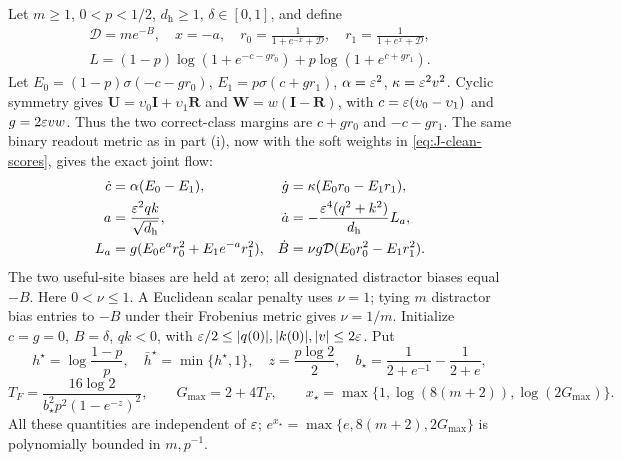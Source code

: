 Let $m\ge1$, $0<p<1/2$, $d_{\mathrm h}\ge1$, $\delta\in[0,1]$, and define
\[
 \begin{gathered}
 \mathcal D=me^{-B},\quad x=-a,\quad
 r_0=\frac1{1+e^{-x}+\mathcal D},\quad r_1=\frac1{1+e^x+\mathcal D},\\
 L=(1-p)\log(1+e^{-c-gr_0})+p\log(1+e^{c+gr_1}).
 \end{gathered}
\]
Let $E_0=(1-p)\sigma(-c-gr_0)$, $E_1=p\sigma(c+gr_1)$, $\alpha=\varepsilon^2$, $\kappa=\varepsilon^2v^2$.
Cyclic symmetry gives $\mathbf U=\upsilon_0\mathbf I+\upsilon_1\mathbf R$ and $\mathbf W=w(\mathbf I-\mathbf R)$, with
$c=\varepsilon(\upsilon_0-\upsilon_1)$ and $g=2\varepsilon vw$. Thus the two correct-class margins are $c+gr_0$ and $-c-gr_1$.
The same binary readout metric as in part (i), now with the soft weights in \cref{eq:J-clean-scores}, gives the exact joint flow:
\begin{align*}
 \dot c&=\alpha(E_0-E_1),&
 \dot g&=\kappa(E_0r_0-E_1r_1),\\
 a&=\frac{\varepsilon^2qk}{\sqrt{d_{\mathrm h}}},&
 \dot a&=-\frac{\varepsilon^4(q^2+k^2)}{d_{\mathrm h}}L_a,\\
 L_a&=g(E_0e^a r_0^2+E_1e^{-a}r_1^2),&
 \dot B&=\nu g\mathcal D(E_0r_0^2-E_1r_1^2).
\end{align*}
The two useful-site biases are held at zero; all designated distractor biases equal $-B$.
Here $0<\nu\le1$. A Euclidean scalar penalty uses $\nu=1$; tying $m$ distractor bias entries to $-B$ under their Frobenius metric gives $\nu=1/m$.
Initialize $c=g=0$, $B=\delta$, $qk<0$, with
$\varepsilon/2\le |q(0)|,|k(0)|,|v|\le2\varepsilon$.
Put
\begin{equation}
 h^\star=\log\frac{1-p}{p},\quad \bar h^\star=\min\{h^\star,1\},\quad
 z=\frac{p\log2}{2},\quad
 b_\star=\frac1{2+e^{-1}}-\frac1{2+e},
\end{equation}
\begin{equation}
 T_F=\frac{16\log2}{b_\star^2p^2(1-e^{-z})^2},\qquad
 G_{\max}=2+4T_F,\qquad x_\star=\max\{1,\log(8(m+2)),\log(2G_{\max})\}.
 \label{eq:CR-constants}
\end{equation}
All these quantities are independent of $\varepsilon$; $e^{x_\star}=\max\{e,8(m+2),2G_{\max}\}$ is polynomially bounded in $m,p^{-1}$.

